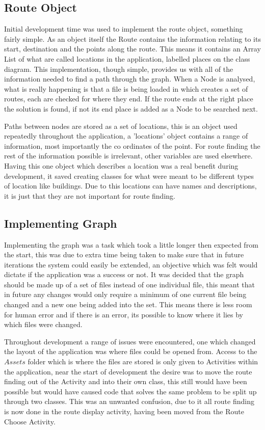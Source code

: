\subsection{Route Object}

Initial development time was used to implement the route object, something fairly simple. As an object itself the Route contains the information relating to its start, destination and the points along the route. This means it contains an Array List of what are called locations in the application, labelled places on the class diagram. This implementation, though simple, provides us with all of the information needed to find a path through the graph. When a Node is analysed, what is really happening is that a file is being loaded in which creates a set of routes, each are checked for where they end. If the route ends at the right place the solution is found, if not its end place is added as a Node to be searched next. 

Paths between nodes are stored as a set of locations, this is an object used repeatedly throughout the application, a 'locations' object contains a range of information, most importantly the co ordinates of the point. For route finding the rest of the information possible is irrelevant, other variables are used elsewhere. Having this one object which describes a location was a real benefit during development, it saved creating classes for what were meant to be different types of location like buildings. Due to this locations can have names and descriptions, it is just that they are not important for route finding. 

\subsection{Implementing Graph}

Implementing the graph was a task which took a little longer then expected from the start, this was due to extra time being taken to make sure that in future iterations the system could easily be extended, an objective which was felt would dictate if the application was a success or not. It was decided that the graph should be made up of a set of files instead of one individual file, this meant that in future any changes would only require a minimum of one current file being changed and a new one being added into the set. This means there is less room for human error and if there is an error, its possible to know where it lies by which files were changed. 

Throughout development a range of issues were encountered, one which changed the layout of the application was where files could be opened from. Access to the $Assets$ folder which is where the files are stored is only given to Activities within the application, near the start of development the desire was to move the route finding out of the Activity and into their own class, this still would have been possible but would have caused code that solves the same problem to be split up through two classes. This was an unwanted confusion, due to it all route finding is now done in the route display activity, having been moved from the Route Choose Activity. 

